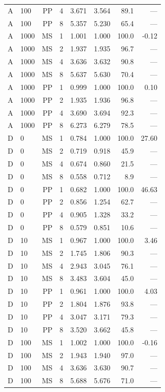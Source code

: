\begin{longtable}{@{}llrrrrrr@{}}
A & 100 & PP & 4 & 3.671 & 3.564 & 89.1 & ---\\
A & 100 & PP & 8 & 5.357 & 5.230 & 65.4 & ---\\
A & 1000 & MS & 1 & 1.001 & 1.000 & 100.0 & -0.12\\
A & 1000 & MS & 2 & 1.937 & 1.935 & 96.7 & ---\\
A & 1000 & MS & 4 & 3.636 & 3.632 & 90.8 & ---\\
A & 1000 & MS & 8 & 5.637 & 5.630 & 70.4 & ---\\
A & 1000 & PP & 1 & 0.999 & 1.000 & 100.0 & 0.10\\
A & 1000 & PP & 2 & 1.935 & 1.936 & 96.8 & ---\\
A & 1000 & PP & 4 & 3.690 & 3.694 & 92.3 & ---\\
A & 1000 & PP & 8 & 6.273 & 6.279 & 78.5 & ---\\
D & 0 & MS & 1 & 0.784 & 1.000 & 100.0 & 27.60\\
D & 0 & MS & 2 & 0.719 & 0.918 & 45.9 & ---\\
D & 0 & MS & 4 & 0.674 & 0.860 & 21.5 & ---\\
D & 0 & MS & 8 & 0.558 & 0.712 & 8.9 & ---\\
D & 0 & PP & 1 & 0.682 & 1.000 & 100.0 & 46.63\\
D & 0 & PP & 2 & 0.856 & 1.254 & 62.7 & ---\\
D & 0 & PP & 4 & 0.905 & 1.328 & 33.2 & ---\\
D & 0 & PP & 8 & 0.579 & 0.851 & 10.6 & ---\\
D & 10 & MS & 1 & 0.967 & 1.000 & 100.0 & 3.46\\
D & 10 & MS & 2 & 1.745 & 1.806 & 90.3 & ---\\
D & 10 & MS & 4 & 2.943 & 3.045 & 76.1 & ---\\
D & 10 & MS & 8 & 3.483 & 3.604 & 45.0 & ---\\
D & 10 & PP & 1 & 0.961 & 1.000 & 100.0 & 4.03\\
D & 10 & PP & 2 & 1.804 & 1.876 & 93.8 & ---\\
D & 10 & PP & 4 & 3.047 & 3.171 & 79.3 & ---\\
D & 10 & PP & 8 & 3.520 & 3.662 & 45.8 & ---\\
D & 100 & MS & 1 & 1.002 & 1.000 & 100.0 & -0.16\\
D & 100 & MS & 2 & 1.943 & 1.940 & 97.0 & ---\\
D & 100 & MS & 4 & 3.636 & 3.630 & 90.7 & ---\\
D & 100 & MS & 8 & 5.688 & 5.676 & 71.0 & ---\\

\end{longtable}

